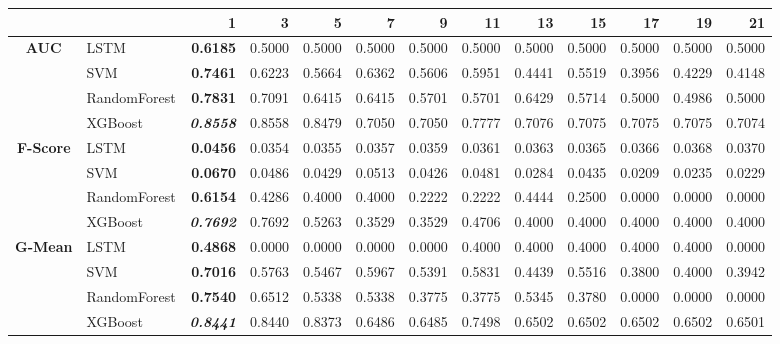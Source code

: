 \begin{table}[H]
	\centering
	\begin{adjustbox}{max width=12cm}
		\begin{tabular}{|c|l|r|r|r|r|r|r|r|r|r|r|r|}
			\hline
			&         &      1  &      3  &      5  &      7  &      9  &      11 &      13 &      15 &      17 &      19 &      21 \\
			\hline
			\textbf{AUC} &  LSTM & \textbf{  0.6185 } &  0.5000 &  0.5000 &  0.5000 &  0.5000 &  0.5000 &  0.5000 &  0.5000 &  0.5000 &  0.5000 &  0.5000 \\
			&  SVM & \textbf{  0.7461 } &  0.6223 &  0.5664 &  0.6362 &  0.5606 &  0.5951 &  0.4441 &  0.5519 &  0.3956 &  0.4229 &  0.4148 \\
			&  RandomForest & \textbf{  0.7831 } &  0.7091 &  0.6415 &  0.6415 &  0.5701 &  0.5701 &  0.6429 &  0.5714 &  0.5000 &  0.4986 &  0.5000 \\
			&  XGBoost & \textit{ \textbf{  0.8558 } } &  0.8558 &  0.8479 &  0.7050 &  0.7050 &  0.7777 &  0.7076 &  0.7075 &  0.7075 &  0.7075 &  0.7074 \\
			\hline
			\textbf{F-Score} &  LSTM & \textbf{  0.0456 } &  0.0354 &  0.0355 &  0.0357 &  0.0359 &  0.0361 &  0.0363 &  0.0365 &  0.0366 &  0.0368 &  0.0370 \\
			&  SVM & \textbf{  0.0670 } &  0.0486 &  0.0429 &  0.0513 &  0.0426 &  0.0481 &  0.0284 &  0.0435 &  0.0209 &  0.0235 &  0.0229 \\
			&  RandomForest & \textbf{  0.6154 } &  0.4286 &  0.4000 &  0.4000 &  0.2222 &  0.2222 &  0.4444 &  0.2500 &  0.0000 &  0.0000 &  0.0000 \\
			&  XGBoost & \textit{ \textbf{  0.7692 } } &  0.7692 &  0.5263 &  0.3529 &  0.3529 &  0.4706 &  0.4000 &  0.4000 &  0.4000 &  0.4000 &  0.4000 \\
			\hline
			\textbf{G-Mean} &  LSTM & \textbf{  0.4868 } &  0.0000 &  0.0000 &  0.0000 &  0.0000 &  0.4000 &  0.4000 &  0.4000 &  0.4000 &  0.4000 & 0.0000 \\
			&  SVM & \textbf{  0.7016 } &  0.5763 &  0.5467 &  0.5967 &  0.5391 &  0.5831 &  0.4439 &  0.5516 &  0.3800 &  0.4000 &  0.3942 \\
			&  RandomForest & \textbf{  0.7540 } &  0.6512 &  0.5338 &  0.5338 &  0.3775 &  0.3775 &  0.5345 &  0.3780 &  0.0000 &  0.0000 &  0.0000 \\
			&  XGBoost & \textit{ \textbf{  0.8441 } } &  0.8440 &  0.8373 &  0.6486 &  0.6485 &  0.7498 &  0.6502 &  0.6502 &  0.6502 &  0.6502 &  0.6501 \\

\end{tabular}
\end{adjustbox}
\end{table}
